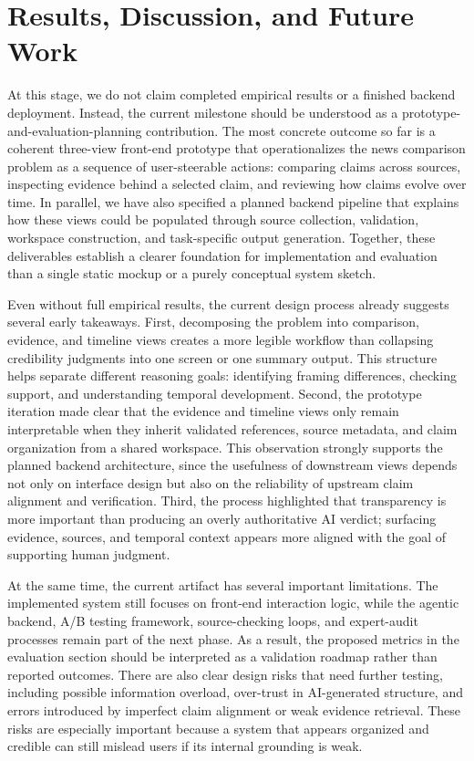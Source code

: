 \documentclass{vgtc}                          %
\begin{document}
\section{Results, Discussion, and Future Work}

At this stage, we do not claim completed empirical results or a finished backend deployment. Instead, the current milestone should be understood as a prototype-and-evaluation-planning contribution. The most concrete outcome so far is a coherent three-view front-end prototype that operationalizes the news comparison problem as a sequence of user-steerable actions: comparing claims across sources, inspecting evidence behind a selected claim, and reviewing how claims evolve over time. In parallel, we have also specified a planned backend pipeline that explains how these views could be populated through source collection, validation, workspace construction, and task-specific output generation. Together, these deliverables establish a clearer foundation for implementation and evaluation than a single static mockup or a purely conceptual system sketch.

Even without full empirical results, the current design process already suggests several early takeaways. First, decomposing the problem into comparison, evidence, and timeline views creates a more legible workflow than collapsing credibility judgments into one screen or one summary output. This structure helps separate different reasoning goals: identifying framing differences, checking support, and understanding temporal development. Second, the prototype iteration made clear that the evidence and timeline views only remain interpretable when they inherit validated references, source metadata, and claim organization from a shared workspace. This observation strongly supports the planned backend architecture, since the usefulness of downstream views depends not only on interface design but also on the reliability of upstream claim alignment and verification. Third, the process highlighted that transparency is more important than producing an overly authoritative AI verdict; surfacing evidence, sources, and temporal context appears more aligned with the goal of supporting human judgment.

At the same time, the current artifact has several important limitations. The implemented system still focuses on front-end interaction logic, while the agentic backend, A/B testing framework, source-checking loops, and expert-audit processes remain part of the next phase. As a result, the proposed metrics in the evaluation section should be interpreted as a validation roadmap rather than reported outcomes. There are also clear design risks that need further testing, including possible information overload, over-trust in AI-generated structure, and errors introduced by imperfect claim alignment or weak evidence retrieval. These risks are especially important because a system that appears organized and credible can still mislead users if its internal grounding is weak.
\end{document}
